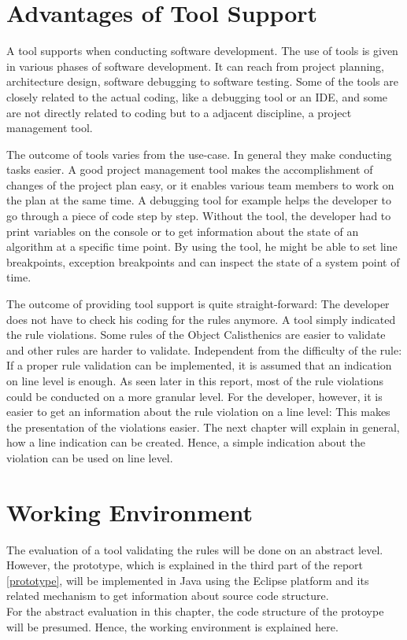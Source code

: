 \section{Advantages of Tool Support}
\label{e:advantages}
A tool supports when conducting software development. The use of tools is given in various phases of software development. It can reach from project planning, architecture design, software debugging to software testing. Some of the tools are closely related to the actual coding, like a debugging tool or an \acf{IDE}, and some are not directly related to coding but to a adjacent discipline, a project management tool. 

The outcome of tools varies from the use-case. In general they make conducting tasks easier. A good project management tool makes the accomplishment of changes of the project plan easy, or it enables various team members to work on the plan at the same time. A debugging tool for example helps the developer to go through a piece of code step by step. Without the tool, the developer had to print variables on the console or to get information about the state of an algorithm at a specific time point. By using the tool, he might be able to set line breakpoints, exception breakpoints and can inspect the state of a system point of time. 

The outcome of providing tool support is quite straight-forward: The developer does not have to check his coding for the rules anymore. A tool simply indicated the rule violations. Some rules of the Object Calisthenics are easier to validate and other rules are harder to validate. Independent from the difficulty of the rule: If a proper rule validation can be implemented, it is assumed that an indication on line level is enough. As seen later in this report, most of the rule violations could be conducted on a more granular level. For the developer, however, it is easier to get an information about the rule violation on a line level: This makes the presentation of the violations easier. The next chapter will explain in general, how a line indication can be created. Hence, a simple indication about the violation can be used on line level. 

\section{Working Environment}
The evaluation of a tool validating the rules will be done on an abstract level. However, the prototype, which is explained in the third part of the report \ref{prototype}, will be implemented in Java using the Eclipse platform and its related mechanism to get information about source code structure. 
\\
For the abstract evaluation in this chapter, the code structure of the protoype will be presumed. Hence, the working environment is explained here. 
\\

